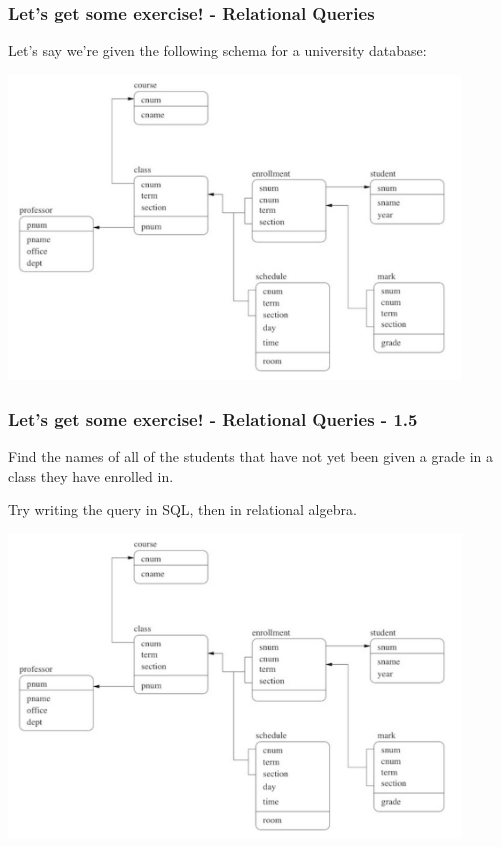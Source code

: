 \begin{frame}
\frametitle{Let's get some exercise! - Relational Queries}

Let's say we're given the following schema for a university database:

\begin{center}
  \includegraphics[width=0.9\textwidth]{images/db-schema.png}
\end{center}

\end{frame}


\begin{frame}
\frametitle{Let's get some exercise! - Relational Queries - 1.5}

Find the names of all of the students that have not yet been given a grade in a class they have enrolled in.

Try writing the query in SQL, then in relational algebra.

\begin{center}
  \includegraphics[width=0.9\textwidth]{images/db-schema.png}
\end{center}

\end{frame}


